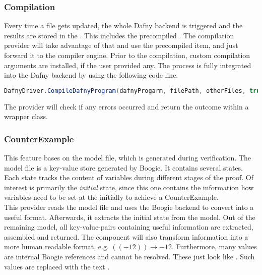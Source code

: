 \subsubsection{Compilation}
Every time a file gets updated, the whole Dafny backend is triggered and the results are stored in the .
This includes the precompiled .
The compilation provider will take advantage of that and use the precompiled item, and just forward it to the compiler engine.
Prior to the compilation, custom compilation arguments are installed, if the user provided any.
The process is fully integrated into the Dafny backend by using the following code line.\\

\begin{lstlisting}[language=csharp, caption={Calling the Dafny Compiler}, captionpos=b, label={lst:dafnycompiler}]
DafnyDriver.CompileDafnyProgram(dafnyProgarm, filePath, otherFiles, true, textwriter);
\end{lstlisting}

The provider will check if any errors occurred and return the outcome within a wrapper class.

\subsubsection{CounterExample}
This feature bases on the model file, which is generated during verification.
The model file is a key-value store generated by Boogie.
It contains several states.
Each state tracks the content of variables during different stages of the proof.
Of interest is primarily the \textit{initial} state, since this one contains the information how variables need to be set at the initially to achieve a CounterExample.\\

This provider reads the model file and uses the Boogie backend to convert into a useful format.
Afterwards, it extracts the initial state from the model.
Out of the remaining model, all key-value-pairs containing useful information are extracted, assembled and returned.
The component will also transform information into a more human readable format, e.g. $((- 12)) \rightarrow -12$.
Furthermore, many values are internal Boogie references and cannot be resolved.
These just look like .
Such values are replaced with the text .\\




